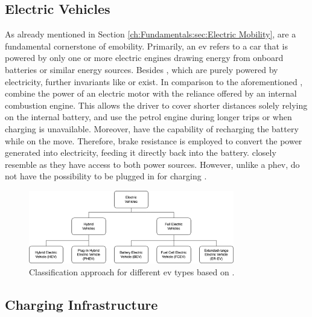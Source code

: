 \subsection{Electric Vehicles}
\label{ch:Fundamentals:sec:Electric Mobility:Electric Vehicles}

As already mentioned in Section \ref{ch:Fundamentals:sec:Electric Mobility},  are a fundamental cornerstone of \acrshort{emobility}. Primarily, an \acrshort{ev} refers to a car that is powered by only one or more electric engines drawing energy from onboard batteries or similar energy sources. 
Besides , which are purely powered by electricity, further invariants like  or  exist. In comparison to the aforementioned ,  combine the power of an electric motor with the reliance offered by an internal combustion engine.
This allows the driver to cover shorter distances solely relying on the internal battery, and use the petrol engine during longer trips or when charging is unavailable. Moreover,  have the capability of recharging the battery while on the move.
Therefore, brake resistance is employed to convert the power generated into electricity, feeding it directly back into the battery.
 closely resemble  as they have access to both power sources. However, unlike a \acrshort{phev},  do not have the possibility to be plugged in for charging \cite{kathiresh_e-mobility_2022}.

\begin{figure}[h]
    \centering
    \includegraphics[width=0.8\textwidth,keepaspectratio]{resources/images/main/1_fundamentals/ElectricVehicleTypes.png}
    \caption{Classification approach for different \acrshort{ev} types based on \cite{acharige_review_2023}.}
    \label{fig:ev-classification}
\end{figure}

\subsection{Charging Infrastructure}
\label{ch:Fundamentals:sec:Electric Mobility:ssec:Charging Infrastructure}

